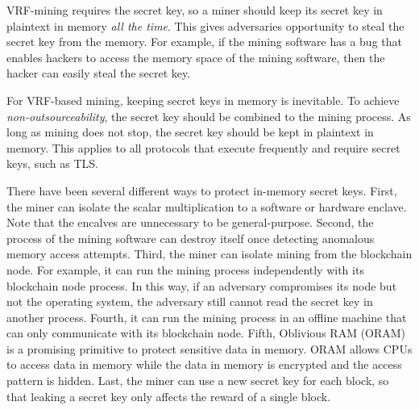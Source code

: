 VRF-mining requires the secret key, so a miner should keep its secret key in plaintext in memory \emph{all the time}.
This gives adversaries opportunity to steal the secret key from the memory.
For example, if the mining software has a bug that enables hackers to access the memory space of the mining software, then the hacker can easily steal the secret key.

For VRF-based mining, keeping secret keys in memory is inevitable.
To achieve \emph{non-outsourceability}, the secret key should be combined to the mining process.
As long as mining does not stop, the secret key should be kept in plaintext in memory.
This applies to all protocols that execute frequently and require secret keys, such as TLS.

There have been several different ways to protect in-memory secret keys.
First, the miner can isolate the scalar multiplication to a software or hardware enclave.
Note that the encalves are unnecessary to be general-purpose.
Second, the process of the mining software can destroy itself once detecting anomalous memory access attempts.
Third, the miner can isolate mining from the blockchain node.
For example, it can run the mining process independently with its blockchain node process.
In this way, if an adversary compromises its node but not the operating system, the adversary still cannot read the secret key in another process.
Fourth, it can run the mining process in an offline machine that can only communicate with its blockchain node.
Fifth, Oblivious RAM (ORAM) is a promising primitive to protect sensitive data in memory.
ORAM allows CPUs to access data in memory while the data in memory is encrypted and the access pattern is hidden.
Last, the miner can use a new secret key for each block, so that leaking a secret key only affects the reward of a single block.
